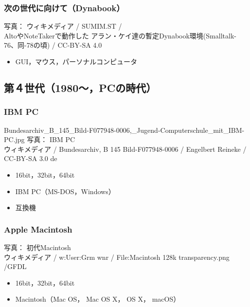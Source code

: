 \documentclass[unicode,handout]{beamer}                   %
\begin{document}
\begin{frame}
  \frametitle{次の世代に向けて（Dynabook）}
        {\tiny 写真： ウィキメディア /  SUMIM.ST / \\
          AltoやNoteTakerで動作した
          アラン・ケイ達の暫定Dynabook環境(Smalltalk-76、同-78の頃) /
          CC-BY-SA 4.0}
  \begin{itemize}
    \item GUI，マウス，パーソナルコンピュータ
  \end{itemize}
  \vfill
\end{frame}

\subsection{第４世代（1980〜，PCの時代）}
\begin{frame}
  \frametitle{IBM PC}
{Bundesarchiv_B_145_Bild-F077948-0006,_Jugend-Computerschule_mit_IBM-PC.jpg}
      {\tiny
          写真： IBM PC \\
          ウィキメディア /
          Bundesarchiv, B 145 Bild-F077948-0006 /
          Engelbert Reineke / CC-BY-SA 3.0 de
      }
  \begin{itemize}
    \item 16bit，32bit，64bit
    \item IBM PC（MS-DOS，Windows）
    \item 互換機
  \end{itemize}
  \vfill
\end{frame}

\begin{frame}
  \frametitle{Apple Macintosh}
      {\tiny
          写真： 初代Macintosh \\
          ウィキメディア / w:User:Grm wnr / 
          File:Macintosh 128k transparency.png /GFDL
      }
  \begin{itemize}
    \item 16bit，32bit，64bit
    \item Macintosh（Mac OS， Mac OS X， OS X， macOS）
  \end{itemize}
  \vfill
\end{frame}
\end{document}
